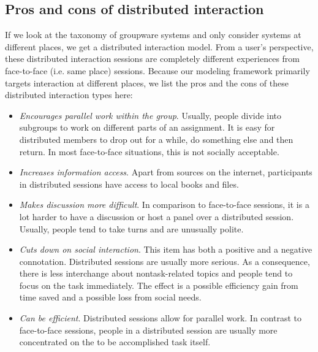 \subsection{Pros and cons of distributed interaction}

If we look at the taxonomy of groupware systems and only consider systems at different places, we get a distributed interaction model. From a user's perspective, these distributed interaction sessions are completely different experiences from face-to-face (i.e. same place) sessions. Because our modeling framework primarily targets interaction at different places, we list the pros and the cons of these distributed interaction types here: 

\begin{itemize}
\item{\textit{Encourages parallel work within the group}. Usually, people divide into subgroups to work on different parts of an assignment. It is easy for distributed members to drop out for a while, do something else and then return. In most face-to-face situations, this is not socially acceptable.}
\item{\textit{Increases information access}. Apart from sources on the internet, participants in distributed sessions have access to local books and files.}
\item{\textit{Makes discussion more difficult}. In comparison to face-to-face sessions, it is a lot harder to have a discussion or host a panel over a distributed session. Usually, people tend to take turns and are unusually polite.}
\item{\textit{Cuts down on social interaction}. This item has both a positive and a negative connotation. Distributed sessions are usually more serious. As a consequence, there is less interchange about nontask-related topics and people tend to focus on the task immediately. The effect is a possible efficiency gain from time saved and a possible loss from social needs.}
\item{\textit{Can be efficient}. Distributed sessions allow for parallel work. In contrast to face-to-face sessions, people in a distributed session are usually more concentrated on the to be accomplished task itself.}
\end{itemize}


